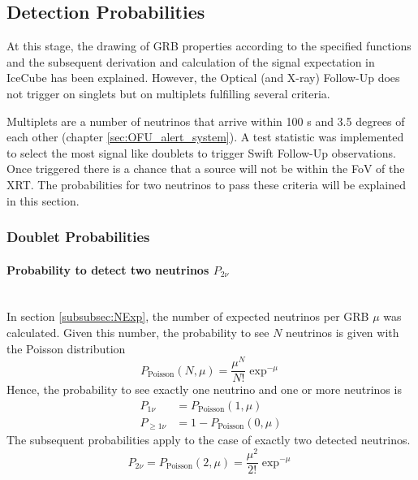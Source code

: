 \subsection{Detection Probabilities}
At this stage, the drawing of GRB properties according to the specified 
functions
and the subsequent derivation and calculation of the signal expectation in
IceCube has been explained. However, the Optical (and X-ray) Follow-Up does not
trigger on singlets but on multiplets fulfilling several criteria.

Multiplets are a number of neutrinos that arrive within 100 s and 3.5 degrees
of each other (chapter \ref{sec:OFU_alert_system}). A test statistic was 
implemented to select the
most signal like doublets to trigger Swift Follow-Up observations. Once 
triggered there
is a chance that a source will not be within the FoV of the XRT. The 
probabilities for two neutrinos to pass these criteria will be 
explained in this section.

\subsubsection{Doublet Probabilities}

\paragraph{Probability to detect two neutrinos $P_{2 \nu}$}$\;$\\
In section \ref{subsubsec:NExp}, the number of expected neutrinos per 
GRB $\mu$ was calculated. 
Given this number, the probability to see $N$ neutrinos is given with the 
Poisson 
distribution
\begin{equation}
  P_\text{Poisson}(N, \mu) = \frac{\mu^N}{N!} \exp^{-\mu}
\end{equation}
Hence, the probability to see exactly one neutrino and one or more neutrinos is 
\begin{eqnarray}
 P_{1 \nu} &= P_\text{Poisson}(1, \mu) \\
 P_{\geq 1 \nu} &= 1 - P_\text{Poisson}(0, \mu)
\end{eqnarray}
The subsequent probabilities apply to the case of exactly two detected 
neutrinos.
\begin{equation}
 P_{2\nu} = P_\text{Poisson}(2, \mu) = \frac{\mu^2}{2!} \exp^{-\mu}
\end{equation}


